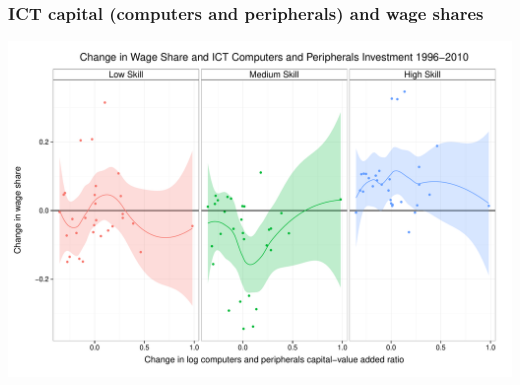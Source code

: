 \documentclass[red]{beamer}
\begin{document}
\begin{frame}[c]
  \frametitle{ICT capital (computers and peripherals) and wage shares}
\begin{center}
  \includegraphics[width=\textwidth]{slides_fig/wage_share_peripherals_skill.pdf}
\end{center}
\end{frame}
\end{document}

